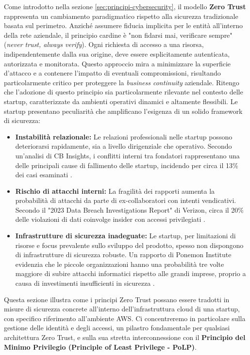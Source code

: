 Come introdotto nella sezione \ref{sec:principi-cybersecurity}, il modello \textbf{Zero Trust} rappresenta un cambiamento paradigmatico rispetto alla sicurezza tradizionale basata sul perimetro. Anziché assumere fiducia implicita per le entità all'interno della rete aziendale, il principio cardine è "non fidarsi mai, verificare sempre" (\textit{never trust, always verify}). Ogni richiesta di accesso a una risorsa, indipendentemente dalla sua origine, deve essere esplicitamente autenticata, autorizzata e monitorata. Questo approccio mira a minimizzare la superficie d'attacco e a contenere l'impatto di eventuali compromissioni, risultando particolarmente critico per proteggere la \textit{business continuity} aziendale. Ritengo che l'adozione di questo principio sia particolarmente rilevante nel contesto delle startup, caratterizzate da ambienti operativi dinamici e altamente flessibili. Le startup presentano peculiarità che amplificano l'esigenza di un solido framework di sicurezza:

\begin{itemize}
    \item \textbf{Instabilità relazionale:} Le relazioni professionali nelle startup possono deteriorarsi rapidamente, sia a livello dirigenziale che operativo. Secondo un'analisi di CB Insights, i conflitti interni tra fondatori rappresentano una delle principali cause di fallimento delle startup, incidendo per circa il 13\% dei casi esaminati \cite{CBInsights2023}. 
    \item \textbf{Rischio di attacchi interni:} La fragilità dei rapporti aumenta la probabilità di attacchi da parte di ex-collaboratori con intenti vendicativi. Secondo il "2023 Data Breach Investigations Report" di Verizon, circa il 20\% delle violazioni di dati coinvolge insider con accessi privilegiati \cite{Verizon2023}.
    \item \textbf{Infrastrutture di sicurezza inadeguate:} Le startup, per limitazioni di risorse e focus prevalente sullo sviluppo del prodotto, spesso non dispongono di infrastrutture di sicurezza robuste. Un rapporto di Ponemon Institute evidenzia che le piccole organizzazioni hanno una probabilità tre volte maggiore di subire attacchi informatici rispetto alle grandi imprese, proprio a causa di investimenti insufficienti in sicurezza \cite{Ponemon2023}.
\end{itemize}
Questa sezione illustra come i principi Zero Trust possano essere tradotti in misure di sicurezza concrete all'interno dell'infrastruttura cloud di una startup, con specifico riferimento all'ambiente AWS. Ci concentreremo in particolare sulla gestione delle identità e degli accessi, un pilastro fondamentale per qualsiasi architettura Zero Trust, e sulla sua stretta interconnessione con il \textbf{Principio del Minimo Privilegio (Principle of Least Privilege - PoLP)}.

